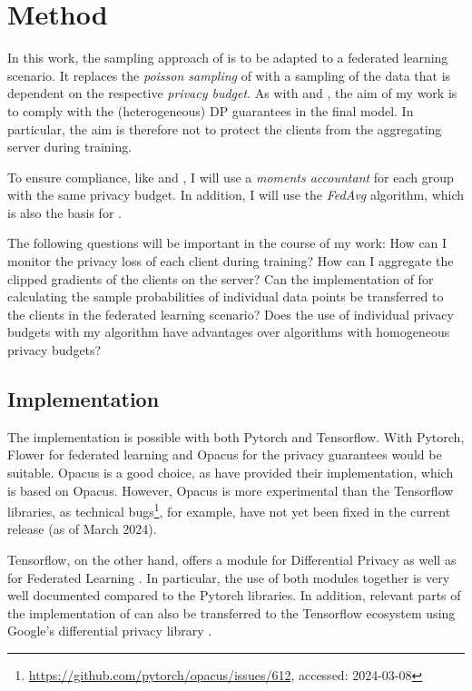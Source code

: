 \chapter{Method}

In this work, the sampling approach of \textcite{boenisch:2023} is to be adapted to a federated learning scenario. It replaces the \textit{poisson sampling} of \textcite{abadi:2016} with a sampling of the data that is dependent on the respective \textit{privacy budget}. As with \textcite{aldaghri:2023} and \textcite{mcmahan:2018}, the aim of my work is to comply with the (heterogeneous) DP guarantees in the final model. In particular, the aim is therefore not to protect the clients from the aggregating server during training.

To ensure compliance, like \textcite{boenisch:2023} and \textcite{aldaghri:2023}, I will use a \textit{moments accountant} for each group with the same privacy budget. In addition, I will use the \textit{FedAvg} algorithm, which is also the basis for \textcite{aldaghri:2023}.

The following questions will be important in the course of my work: How can I monitor the privacy loss of each client during training? How can I aggregate the clipped gradients of the clients on the server? Can the implementation of \textcite{boenisch:2023} for calculating the sample probabilities of individual data points be transferred to the clients in the federated learning scenario? Does the use of individual privacy budgets with my algorithm have advantages over algorithms with homogeneous privacy budgets?

\section{Implementation}

The implementation is possible with both Pytorch and Tensorflow. With Pytorch, Flower \parencite{beutel:2020} for federated learning and Opacus \parencite{yousefpour:2021} for the privacy guarantees would be suitable. Opacus is a good choice, as \textcite{boenisch:2023} have provided their implementation, which is based on Opacus. However, Opacus is more experimental than the Tensorflow libraries, as technical bugs\footnote{\url{https://github.com/pytorch/opacus/issues/612}, accessed: 2024-03-08}, for example, have not yet been fixed in the current release (as of March 2024). 

Tensorflow, on the other hand, offers a module for Differential Privacy \parencite{tfprivacy} as well as for Federated Learning \parencite{tffederated}. In particular, the use of both modules together is very well documented compared to the Pytorch libraries. In addition, relevant parts of the implementation of \textcite{boenisch:2023} can also be transferred to the Tensorflow ecosystem using Google's differential privacy library \parencite{googledp}.

